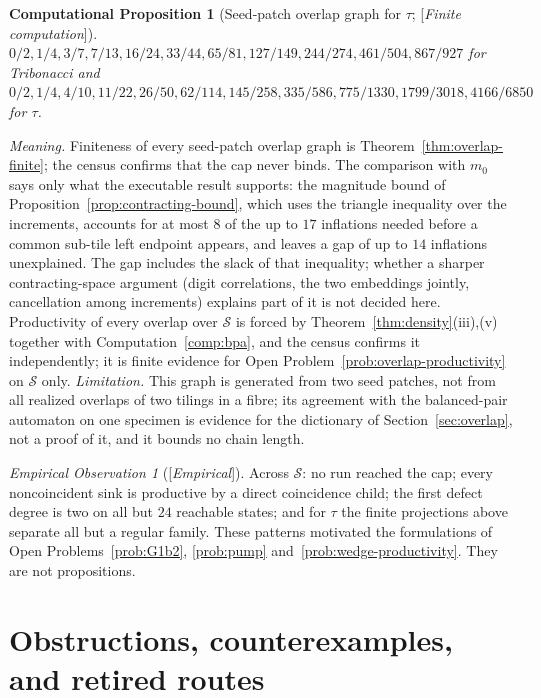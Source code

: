 \documentclass[11pt]{amsart}
\theoremstyle{plain}
\newtheorem{computation}[theorem]{Computational Proposition}
\theoremstyle{definition}
\theoremstyle{remark}
\newtheorem{observation}[theorem]{Empirical Observation}
\newcommand{\Status}[1]{\textup{[\textit{#1}]}}
\begin{document}
\begin{computation}[Seed-patch overlap graph for $\tau$; \Status{Finite computation}]
$0/2,1/4,3/7,7/13,16/24,33/44,65/81,127/149,244/274,461/504,867/927$ for Tribonacci and $0/2,1/4,4/10,11/22,26/50,62/114,145/258,335/586,775/1330,1799/3018,4166/6850$ for $\tau$.
\end{computation}

\emph{Meaning.} Finiteness of every seed-patch overlap graph is Theorem~\ref{thm:overlap-finite}; the census confirms that the cap never binds. The comparison with $m_0$ says only what the executable result supports: the magnitude bound of Proposition~\ref{prop:contracting-bound}, which uses the triangle inequality over the increments, accounts for at most $8$ of the up to $17$ inflations needed before a common sub-tile left endpoint appears, and leaves a gap of up to $14$ inflations unexplained. The gap includes the slack of that inequality; whether a sharper contracting-space argument (digit correlations, the two embeddings jointly, cancellation among increments) explains part of it is not decided here. Productivity of every overlap over $\mathcal S$ is forced by Theorem~\ref{thm:density}(iii),(v) together with Computation~\ref{comp:bpa}, and the census confirms it independently; it is finite evidence for Open Problem~\ref{prob:overlap-productivity} on $\mathcal S$ only. \emph{Limitation.} This graph is generated from two seed patches, not from all realized overlaps of two tilings in a fibre; its agreement with the balanced-pair automaton on one specimen is evidence for the dictionary of Section~\ref{sec:overlap}, not a proof of it, and it bounds no chain length.

\begin{observation}[\Status{Empirical}]\label{obs:empirical}
Across $\mathcal S$: no run reached the cap; every noncoincident sink is productive by a direct coincidence child; the first defect degree is two on all but $24$ reachable states; and for $\tau$ the finite projections above separate all but a regular family. These patterns motivated the formulations of Open Problems~\ref{prob:G1b2}, \ref{prob:pump} and~\ref{prob:wedge-productivity}. They are not propositions.
\end{observation}

\section{Obstructions, counterexamples, and retired routes}\label{sec:obstructions}
\end{document}

